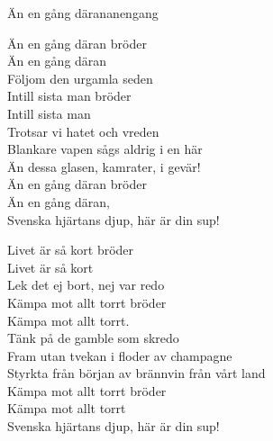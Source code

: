 \begin{song}{Än en gång däran}{anengang}
\begin{vers}
Än en gång däran bröder\\
Än en gång däran\\
Följom den urgamla seden\\
Intill sista man bröder\\
Intill sista man\\
Trotsar vi hatet och vreden\\
Blankare vapen sågs aldrig i en här\\
Än dessa glasen, kamrater, i gevär!\\
Än en gång däran bröder\\
Än en gång däran,  \\
Svenska hjärtans djup, här är din sup!\\
\end{vers}
\begin{vers}
Livet är så kort bröder\\
Livet är så kort\\
Lek det ej bort, nej var redo\\
Kämpa mot allt torrt bröder\\
Kämpa mot allt torrt. \\
Tänk på de gamble som skredo\\
Fram utan tvekan i floder av champagne\\
Styrkta från början av brännvin från vårt land\\
Kämpa mot allt torrt bröder\\
Kämpa mot allt torrt\\
Svenska hjärtans djup, här är din sup!\\
\end{vers}
\end{song}

